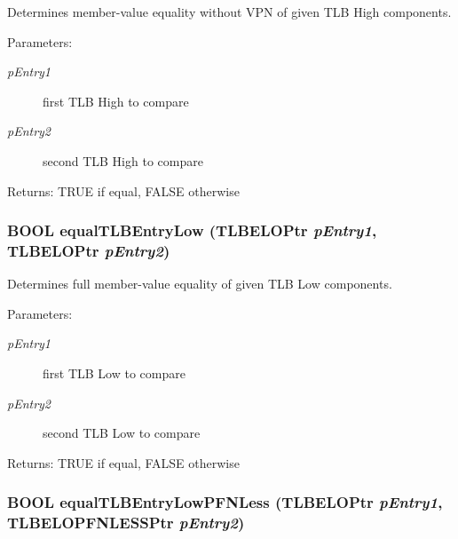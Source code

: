 Determines member-value equality without VPN of given TLB High components. \begin{Desc}
\item[Parameters:]
\begin{description}
\item[{\em pEntry1}]first TLB High to compare \item[{\em pEntry2}]second TLB High to compare \end{description}
\end{Desc}
\begin{Desc}
\item[Returns:]TRUE if equal, FALSE otherwise \end{Desc}
\hypertarget{group___v_m_m___p_t_e_gae1fa5dc951be8567919098dbb0d3255}{
\subsubsection[{equalTLBEntryLow}]{\setlength{\rightskip}{0pt plus 5cm}BOOL equalTLBEntryLow ({\bf TLBELOPtr} {\em pEntry1}, \/  {\bf TLBELOPtr} {\em pEntry2})}}
\label{group___v_m_m___p_t_e_gae1fa5dc951be8567919098dbb0d3255}


Determines full member-value equality of given TLB Low components. \begin{Desc}
\item[Parameters:]
\begin{description}
\item[{\em pEntry1}]first TLB Low to compare \item[{\em pEntry2}]second TLB Low to compare \end{description}
\end{Desc}
\begin{Desc}
\item[Returns:]TRUE if equal, FALSE otherwise \end{Desc}
\hypertarget{group___v_m_m___p_t_e_g39d9945124ca0c249463753e6e67716b}{
\subsubsection[{equalTLBEntryLowPFNLess}]{\setlength{\rightskip}{0pt plus 5cm}BOOL equalTLBEntryLowPFNLess ({\bf TLBELOPtr} {\em pEntry1}, \/  {\bf TLBELOPFNLESSPtr} {\em pEntry2})}}
\label{group___v_m_m___p_t_e_g39d9945124ca0c249463753e6e67716b}


